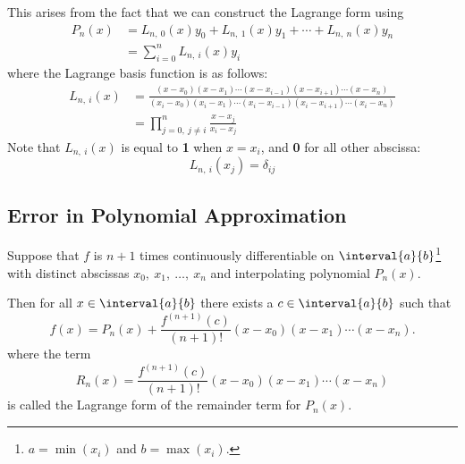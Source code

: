 \documentclass{article}
\begin{document}
This arises from the fact that we can construct the Lagrange form using
\begin{align*}
    P_n\left( x \right) & = L_{n,\: 0}\left( x \right) y_0 + L_{n,\: 1}\left( x \right) y_1 + \cdots + L_{n,\: n}\left( x \right) y_n \\
                        & = \sum_{i = 0}^n L_{n,\: i}\left( x \right) y_i
\end{align*}
where the Lagrange basis function is as follows:
\begin{align*}
    L_{n,\: i}\left( x \right) & = \frac{\left( x - x_0 \right)\left( x - x_1 \right) \cdots \left( x - x_{i - 1} \right) \left( x - x_{i + 1} \right) \cdots \left( x - x_n \right)}{\left( x_i - x_0 \right)\left( x_i - x_1 \right) \cdots \left( x_i - x_{i - 1} \right) \left( x_i - x_{i + 1} \right) \cdots \left( x_i - x_n \right)} \\
                               & = \prod_{j = 0,\: j \neq i}^n \frac{x - x_j}{x_i - x_j}
\end{align*}
Note that \(L_{n,\: i}\left( x \right)\) is equal to \textbf{1} when \(x = x_i\), and \textbf{0} for all other abscissa:
\begin{equation*}
    L_{n,\: i}\left( x_j \right) = \delta_{ij}
\end{equation*}
\subsection{Error in Polynomial Approximation}
\begin{theorem}
    Suppose that \(f\) is \(n + 1\) times continuously \linebreak differentiable on \(\interval{a}{b}\)\footnote{\(a = \min \left( x_i \right)\) and \(b = \max \left( x_i \right)\).}
    with distinct abscissas \(x_0,\: x_1,\: \dots,\: x_n\) and interpolating polynomial
    \(P_n\left( x \right)\).

    Then for all \(x \in \interval{a}{b}\) there exists a \(c \in \interval{a}{b}\) such that
    \begin{equation*}
        f\left( x \right) = P_n\left( x \right) + \frac{f^{\left( n + 1 \right)} \left( c \right)}{\left( n + 1 \right)!} \left( x - x_0 \right) \left( x - x_1 \right) \cdots \left( x - x_n \right).
    \end{equation*}
    where the term
    \begin{equation*}
        R_n\left( x \right) = \frac{f^{\left( n + 1 \right)} \left( c \right)}{\left( n + 1 \right)!} \left( x - x_0 \right) \left( x - x_1 \right) \cdots \left( x - x_n \right)
    \end{equation*}
    is called the Lagrange form of the remainder term for \(P_n\left( x \right)\).
\end{theorem}
\end{document}
